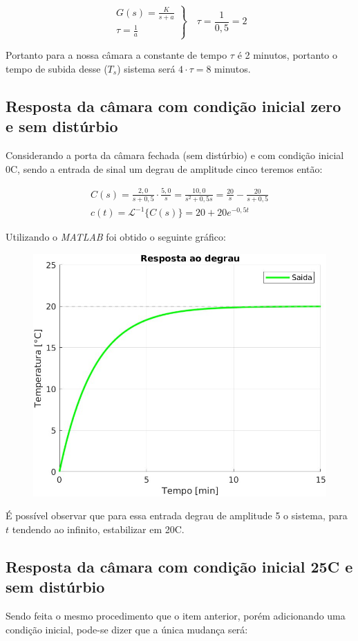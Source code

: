 \documentclass[a4paper,12pt]{article}
\begin{document}
		\begin{equation}
			\left.
			\begin{array}{c}
				\displaystyle G(s) = \frac{K}{s+a} \\[20pt]
				\displaystyle \tau = \frac{1}{a}
			\end{array}
			\right\}
			\quad \tau = \frac{1}{0,5} = 2
		\end{equation}
	
		Portanto para a nossa câmara a constante de tempo $\tau$ é 2 minutos, portanto o tempo de subida desse ($T_s$) sistema será $4 \cdot \tau = 8$ minutos.
	
	\subsection{Resposta da câmara com condição inicial zero e sem distúrbio}
		Considerando a porta da câmara fechada (sem distúrbio) e com condição inicial 0\degree C, sendo a entrada de sinal um degrau de amplitude cinco teremos então:
		

		\begin{gather}
			C(s) = \frac{2,0}{s+0,5} \cdot \frac{5,0}{s} = \frac{10,0}{s^2 + 0,5s} = \frac{20}{s} - \frac{20}{s+0,5} \\[20pt]
			c(t) = \mathcal{L}^{-1} \{ C(s) \} = 20 + 20e^{-0,5t}
		\end{gather}
	
		Utilizando o \textit{MATLAB} foi obtido o seguinte gráfico:
		
		\begin{figure}[H]
			\centering
			\includegraphics[width=0.5\linewidth]{images/respb.jpg}
			\label{fig:resposta_b}
		\end{figure}
	
		É possível observar que para essa entrada degrau de amplitude 5 o sistema, para $t$ tendendo ao infinito, estabilizar em 20\degree C.
		
	\subsection{Resposta da câmara com condição inicial 25\degree C e sem distúrbio}
		Sendo feita o mesmo procedimento que o item anterior, porém adicionando uma condição inicial, pode-se dizer que a única mudança será:
		
\end{document}
